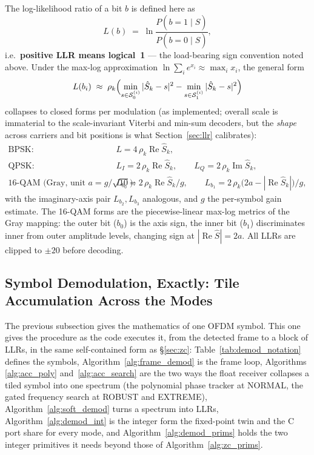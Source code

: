 The log-likelihood ratio of a bit $b$ is defined here as
\begin{equation}
    L(b) \;=\;
    \ln \frac{P(b = 1 \mid \hat{S})}{P(b = 0 \mid \hat{S})},
\end{equation}
i.e.\ \textbf{positive LLR means logical~1} --- the load-bearing sign
convention noted above.  Under the max-log approximation
$\ln \sum_i e^{x_i} \approx \max_i x_i$, the general form
\begin{equation}
    L(b_i) \;\approx\; \rho_k
    \Bigl( \min_{s \in \mathcal{S}_0^{(i)}} |\hat{S}_k - s|^2
         - \min_{s \in \mathcal{S}_1^{(i)}} |\hat{S}_k - s|^2 \Bigr)
\end{equation}
collapses to closed forms per modulation (as implemented; overall
scale is immaterial to the scale-invariant Viterbi and min-sum
decoders, but the \emph{shape} across carriers and bit positions is
what Section~\ref{sec:llr} calibrates):
\begin{align}
    \text{BPSK:}\quad
        & L = 4\,\rho_k \operatorname{Re}\hat{S}_k, \\
    \text{QPSK:}\quad
        & L_I = 2\,\rho_k \operatorname{Re}\hat{S}_k,
    \qquad L_Q = 2\,\rho_k \operatorname{Im}\hat{S}_k, \\
    \text{16-QAM (Gray, unit } a = g/\sqrt{10}\text{):}\quad
        & L_{b_0} = 2\,\rho_k \operatorname{Re}\hat{S}_k / g,
    \qquad L_{b_1} = 2\,\rho_k
        \bigl(2a - |\operatorname{Re}\hat{S}_k|\bigr) / g,
    \label{eq:qam_llr}
\end{align}
with the imaginary-axis pair $L_{b_2}, L_{b_3}$ analogous, and $g$ the
per-symbol gain estimate.  The 16-QAM forms are the piecewise-linear
max-log metrics of the Gray mapping: the outer bit ($b_0$) is the axis
sign, the inner bit ($b_1$) discriminates inner from outer amplitude
levels, changing sign at $|\!\operatorname{Re}\hat S| = 2a$.  All LLRs
are clipped to $\pm 20$ before decoding.

\subsection{Symbol Demodulation, Exactly: Tile Accumulation Across the Modes}
\label{sec:demod_exact}

The previous subsection gives the mathematics of one OFDM symbol.  This
one gives the procedure as the code executes it, from the detected
frame to a block of LLRs, in the same self-contained form as
\S\ref{sec:zc}: Table~\ref{tab:demod_notation} defines the symbols,
Algorithm~\ref{alg:frame_demod} is the frame loop, Algorithms
\ref{alg:acc_poly} and~\ref{alg:acc_search} are the two ways the float
receiver collapses a tiled symbol into one spectrum (the polynomial
phase tracker at NORMAL, the gated frequency search at ROBUST and
EXTREME), Algorithm~\ref{alg:soft_demod} turns a spectrum into LLRs,
Algorithm~\ref{alg:demod_int} is the integer form the fixed-point twin
and the C port share for every mode, and Algorithm~\ref{alg:demod_prims}
holds the two integer primitives it needs beyond those of
Algorithm~\ref{alg:zc_prims}.

